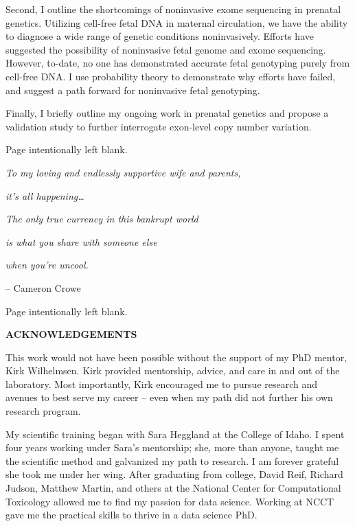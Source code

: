 \documentclass[11pt,letterpaper]{book}
\makeatletter
\newcommand*{\blankpage}{%
\vspace*{\fill}
{\centering Page intentionally left blank. \par}
\vspace{\fill}}
\renewcommand*{\cleardoublepage}{\clearpage\if@twoside \ifodd\c@page\else
\blankpage
\thispagestyle{empty}
\newpage
\if@twocolumn\hbox{}\newpage\fi\fi\fi}
\newcommand{\mytwoin}[1]{
\vspace*{0.6875in}
\begin{center}
\bfseries\Large\MakeUppercase{#1}
\end{center}
}
\makeatother
\begin{document}
  Second, I outline the shortcomings of noninvasive exome sequencing in prenatal genetics.
  Utilizing cell-free fetal DNA in maternal circulation, we have the ability to diagnose a wide range of genetic conditions noninvasively.
  Efforts have suggested the possibility of noninvasive fetal genome and exome sequencing.
  However, to-date, no one has demonstrated accurate fetal genotyping purely from cell-free DNA.
  I use probability theory to demonstrate why efforts have failed, and suggest a path forward for noninvasive fetal genotyping.
  
  Finally, I briefly outline my ongoing work in prenatal genetics and propose a validation study to further interrogate exon-level copy number variation.

  \cleardoublepage
  \vspace*{0.75in}
  \begin{center}
    \emph{To my loving and endlessly supportive wife and parents,}
    
    \emph{it's all happening\ldots{}}
    
    \vspace{3in}
    \flushright
    
    \emph{The only true currency in this bankrupt world}
    
    \emph{is what you share with someone else}
    
    \emph{when you're uncool.}
    
    -- Cameron Crowe
  \end{center}

  \cleardoublepage
  \mytwoin{Acknowledgements}
  This work would not have been possible without the support of my PhD mentor, Kirk Wilhelmsen.
  Kirk provided mentorship, advice, and care in and out of the laboratory.
  Most importantly, Kirk encouraged me to pursue research and avenues to best serve my career -- even when my path did not further his own research program.
  
  My scientific training began with Sara Heggland at the College of Idaho.
  I spent four years working under Sara's mentorship; she, more than anyone, taught me the scientific method and galvanized my path to research.
  I am forever grateful she took me under her wing.
  After graduating from college, David Reif, Richard Judson, Matthew Martin, and others at the National Center for Computational Toxicology allowed me to find my passion for data science.
  Working at NCCT gave me the practical skills to thrive in a data science PhD.
  
\end{document}
